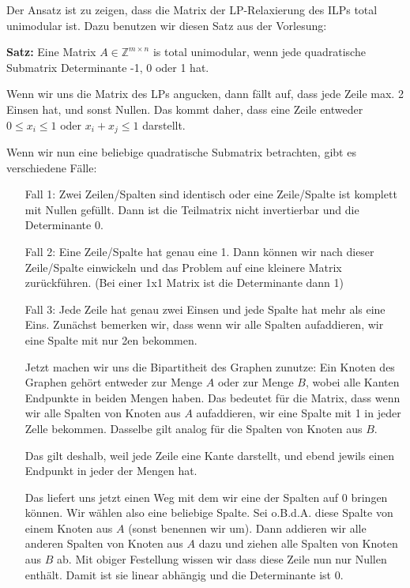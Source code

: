 

\DeclareMathOperator{\vc}{vc}





\subexercise
\label{sec:vc-bp}

Der Ansatz ist zu zeigen, dass die Matrix der LP-Relaxierung des ILPs total unimodular ist.
Dazu benutzen wir diesen Satz aus der Vorlesung:

\begin{center}
	\textbf{Satz:} Eine Matrix $A \in \mathbb{Z}^{m \times n}$ is total unimodular, wenn jede quadratische Submatrix Determinante -1, 0 oder 1 hat.
\end{center}

Wenn wir uns die Matrix des LPs angucken, dann fällt auf, dass jede Zeile max. 2 Einsen hat, und sonst Nullen. Das kommt daher, dass eine Zeile entweder $0 \leq x_i \leq 1$ oder
$x_i + x_j \leq 1$ darstellt.

Wenn wir nun eine beliebige quadratische Submatrix betrachten, gibt es verschiedene Fälle:

\begin{itemize}
	\item[Fall 1:] Zwei Zeilen/Spalten sind identisch oder eine Zeile/Spalte ist komplett mit Nullen gefüllt. Dann ist die Teilmatrix nicht invertierbar und die Determinante 0.
	\item[Fall 2:] Eine Zeile/Spalte hat genau eine 1. Dann können wir nach dieser Zeile/Spalte einwickeln und das Problem auf eine kleinere Matrix zurückführen. (Bei einer 1x1 Matrix ist die Determinante dann 1)
	\item[Fall 3:] Jede Zeile hat genau zwei Einsen und jede Spalte hat mehr als eine Eins. Zunächst bemerken wir, dass wenn wir alle Spalten aufaddieren, wir eine Spalte mit nur 2en bekommen. 
	
	Jetzt machen wir uns die Bipartitheit des Graphen zunutze: Ein Knoten des Graphen gehört entweder zur Menge $A$ oder zur Menge $B$, wobei alle Kanten Endpunkte in beiden Mengen haben. Das bedeutet für die Matrix, dass wenn wir alle Spalten von Knoten aus $A$ aufaddieren, wir eine Spalte mit 1 in jeder Zelle bekommen. Dasselbe gilt analog für die Spalten von Knoten aus $B$.

	Das gilt deshalb, weil jede Zeile eine Kante darstellt, und ebend jewils einen Endpunkt in jeder der Mengen hat.

	Das liefert uns jetzt einen Weg mit dem wir eine der Spalten auf 0 bringen können.
	Wir wählen also eine beliebige Spalte. Sei o.B.d.A. diese Spalte von einem Knoten aus $A$ (sonst benennen wir um). Dann addieren wir alle anderen Spalten von Knoten aus $A$ dazu und ziehen alle Spalten von Knoten aus $B$ ab. Mit obiger Festellung wissen wir dass diese Zeile nun nur Nullen enthält. Damit ist sie linear abhängig und die Determinante ist 0.
\end{itemize}

